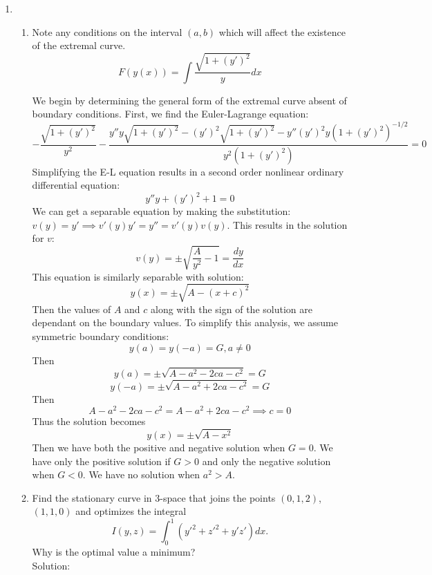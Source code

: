 \documentclass[12pt]{article}
\numberwithin{equation}{section}
\begin{document}
\begin{enumerate}
\item \begin{enumerate} \item Note any conditions on the interval $(a,b)$ which will affect the existence of the extremal curve.
    $$F(y(x))=\int \frac{\sqrt{1+(y')^2}}{y} dx$$

    We begin by determining the general form of the extremal curve absent of boundary conditions. First, we find the Euler-Lagrange equation:
    $$-\frac{\sqrt{1+(y')^2}}{y^2}-\frac{y''y\sqrt{1+(y')^2}-(y')^2\sqrt{1+(y')^2}-y''(y')^2y(1+(y')^2)^{-1/2}}{y^2(1+(y')^2)}=0$$
    Simplifying the E-L equation results in a second order nonlinear ordinary differential equation:
    $$y''y+(y')^2+1=0$$
    We can get a separable equation by making the substitution: $v(y)=y'\implies v'(y)y'=y''=v'(y)v(y)$. This results in the solution for $v$:
    $$v(y)=\pm\sqrt{\frac{A}{y^2}-1}=\frac{dy}{dx}$$
    This equation is similarly separable with solution:
    $$y(x)=\pm\sqrt{A-(x+c)^2}$$
    Then the values of $A$ and $c$ along with the sign of the solution are dependant on the boundary values. To simplify this analysis, we assume symmetric boundary conditions:
    $$y(a)=y(-a)=G, a\neq 0$$
    Then
    $$y(a)=\pm\sqrt{A-a^2-2ca-c^2}=G$$
    $$y(-a)=\pm\sqrt{A-a^2+2ca-c^2}=G$$
    Then
    $$A-a^2-2ca-c^2=A-a^2+2ca-c^2\implies c=0$$
    Thus the solution becomes
    $$y(x)=\pm\sqrt{A-x^2}$$
    Then we have both the positive and negative solution when $G=0$. We have only the positive solution if $G>0$ and only the negative solution when $G<0$. We have no solution when $a^2>A$.

    \item Find the stationary curve in 3-space that joins the points $(0,1,2)$, $(1,1,0)$ and optimizes the integral
    $$I(y,z)=\int_0^1(y'^2+z'^2+y'z')dx.$$
    Why is the optimal value a minimum?\\

    Solution:\\


\end{enumerate}
\end{enumerate}
\end{document}
